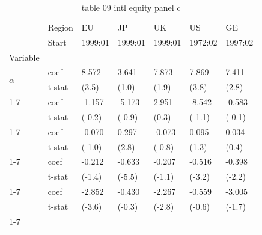 \begin{table}[htbp]
  \centering
  \caption{table 09 intl equity panel c}
  \label{tab:table_09_intl_equity_panel_c}
  \begin{tabular}{lllllll}
\toprule
 & Region & EU & JP & UK & US & GE \\
 & Start & 1999:01 & 1999:01 & 1999:01 & 1972:02 & 1997:02 \\
Variable &  &  &  &  &  &  \\
\midrule
\multirow[t]{2}{*}{$\alpha$} & coef & 8.572 & 3.641 & 7.873 & 7.869 & 7.411 \\
 & t-stat & (3.5) & (1.0) & (1.9) & (3.8) & (2.8) \\
\cline{1-7}
\multirow[t]{2}{*}{$I_B$} & coef & -1.157 & -5.173 & 2.951 & -8.542 & -0.583 \\
 & t-stat & (-0.2) & (-0.9) & (0.3) & (-1.1) & (-0.1) \\
\cline{1-7}
\multirow[t]{2}{*}{$R^e_m$} & coef & -0.070 & 0.297 & -0.073 & 0.095 & 0.034 \\
 & t-stat & (-1.0) & (2.8) & (-0.8) & (1.3) & (0.4) \\
\cline{1-7}
\multirow[t]{2}{*}{$I_B R^e_m$} & coef & -0.212 & -0.633 & -0.207 & -0.516 & -0.398 \\
 & t-stat & (-1.4) & (-5.5) & (-1.1) & (-3.2) & (-2.2) \\
\cline{1-7}
\multirow[t]{2}{*}{$\hat{\sigma}^2_m R^e_m$} & coef & -2.852 & -0.430 & -2.267 & -0.559 & -3.005 \\
 & t-stat & (-3.6) & (-0.3) & (-2.8) & (-0.6) & (-1.7) \\
\cline{1-7}
\bottomrule
\end{tabular}

\end{table}
